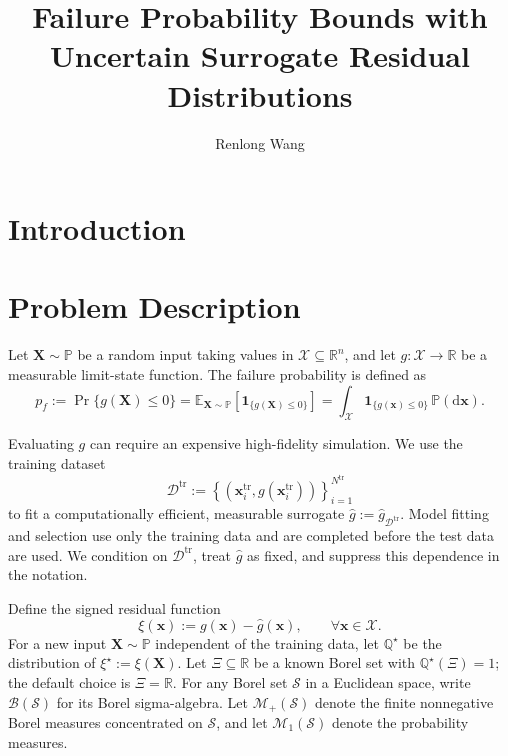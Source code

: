 \documentclass[review,11pt,3p,authoryear,nopreprintline]{elsarticle}
\begin{document}
\begin{frontmatter}
  \title{Failure Probability Bounds with Uncertain Surrogate Residual Distributions}

  \author[inst1]{Renlong Wang}

  \begin{abstract}
  \end{abstract}

  \begin{keyword}
  \end{keyword}
\end{frontmatter}

\section{Introduction}

\section{Problem Description}
\label{sec-problem}

Let $\bm X\sim\mathbb P$ be a random input taking values in $\mathcal X\subseteq\mathbb R^n$, and let $g:\mathcal X\to\mathbb R$ be a measurable limit-state function. The failure probability is defined as
\[
  p_f:=\Pr\{g(\bm X)\le0\}=\mathbb E_{\bm X\sim\mathbb P}\left[\mathbf 1_{\{g(\bm X)\le0\}}\right]=\int_{\mathcal X}\mathbf 1_{\{g(\bm x)\le0\}}\,\mathbb P(\mathrm d\bm x).
\]

Evaluating $g$ can require an expensive high-fidelity simulation. We use the training dataset
\[
  \mathcal D^{\mathrm{tr}}:=\left\{\left(\bm x_i^{\mathrm{tr}},g(\bm x_i^{\mathrm{tr}})\right)\right\}_{i=1}^{N^{\mathrm{tr}}}
\]
to fit a computationally efficient, measurable surrogate $\hat g:=\hat g_{\mathcal D^{\mathrm{tr}}}$. Model fitting and selection use only the training data and are completed before the test data are used. We condition on $\mathcal D^{\mathrm{tr}}$, treat $\hat g$ as fixed, and suppress this dependence in the notation.

Define the signed residual function
\[
  \xi(\bm x):=g(\bm x)-\hat g(\bm x),\qquad \forall \bm x\in\mathcal X.
\]
For a new input $\bm X\sim\mathbb P$ independent of the training data, let $\mathbb Q^\star$ be the distribution of $\xi^\star:=\xi(\bm X)$. Let $\Xi\subseteq\mathbb R$ be a known Borel set with $\mathbb Q^\star(\Xi)=1$; the default choice is $\Xi=\mathbb R$. For any Borel set $\mathcal S$ in a Euclidean space, write $\mathcal B(\mathcal S)$ for its Borel sigma-algebra. Let $\mathcal M_+(\mathcal S)$ denote the finite nonnegative Borel measures concentrated on $\mathcal S$, and let $\mathcal M_1(\mathcal S)$ denote the probability measures.
\end{document}
